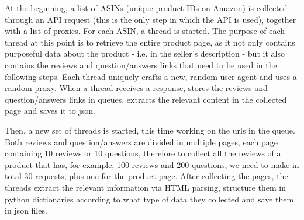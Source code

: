 \documentclass[LaM,binding=0.6cm]{sapthesis}
\begin{document}
At the beginning, a list of ASINs (unique product IDs on Amazon) is collected through an API request (this is the only step in which the API is used), together with a list of proxies. For each ASIN, a thread is started. The purpose of each thread at this point is to retrieve the entire product page, as it not only contains purposeful data about the product - i.e. in the seller's description - but it also contains the reviews and question/answers links that need to be used in the following steps. Each thread uniquely crafts a new, random user agent and uses a random proxy. When a thread receives a response, stores the reviews and question/answers links in queues, extracts the relevant content in the collected page and saves it to json. 

Then, a new set of threads is started, this time working on the urls in the queue. Both reviews and question/answers are divided in multiple pages, each page containing 10 reviews or 10 questions, therefore to collect all the reviews of a product that has, for example, 100 reviews and 200 questions, we need to make in total 30 requests, plus one for the product page. After collecting the pages, the threads extract the relevant information via HTML parsing, structure them in python dictionaries according to what type of data they collected and save them in json files.  
\end{document}
